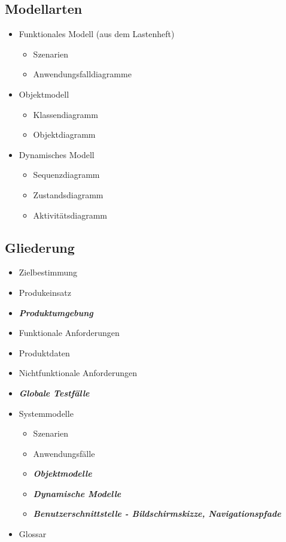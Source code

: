 \documentclass[parskip=full, 12pt]{scrartcl}
\begin{document}
		\subsection{Modellarten}
		
			\begin{itemize}
				\item Funktionales Modell (aus dem Lastenheft)
				\begin{itemize}
					\item Szenarien
					\item Anwendungsfalldiagramme
				\end{itemize}
				\item Objektmodell
				\begin{itemize}
					\item Klassendiagramm
					\item Objektdiagramm
				\end{itemize}
				\item Dynamisches Modell
				\begin{itemize}
					\item Sequenzdiagramm
					\item Zustandsdiagramm
					\item Aktivitätsdiagramm
				\end{itemize}
			\end{itemize}
		
		\newpage
		\subsection{Gliederung}
		
			\begin{itemize}
				\item Zielbestimmung 
				\item Produkeinsatz
				\item \textbf{\textit{Produktumgebung}}
				\item Funktionale Anforderungen
				\item Produktdaten
				\item Nichtfunktionale Anforderungen
				\item \textbf{\textit{Globale Testfälle}}
				\item Systemmodelle
				\begin{itemize}
					\item Szenarien
					\item Anwendungsfälle
					\item \textbf{\textit{Objektmodelle}}
					\item \textbf{\textit{Dynamische Modelle}}
					\item \textbf{\textit{Benutzerschnittstelle - Bildschirmskizze, Navigationspfade}}
				\end{itemize}
				\item Glossar
			\end{itemize}
		
\end{document}
